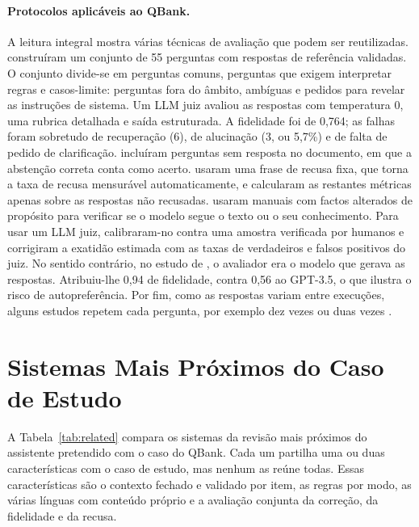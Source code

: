 \paragraph{Protocolos aplicáveis ao QBank.} A leitura integral mostra várias técnicas de avaliação que podem ser reutilizadas. \textcite{buti2026evaluating} construíram um conjunto de 55 perguntas com respostas de referência validadas. O conjunto divide-se em perguntas comuns, perguntas que exigem interpretar regras e casos-limite: perguntas fora do âmbito, ambíguas e pedidos para revelar as instruções de sistema. Um \gls{LLM} juiz avaliou as respostas com temperatura 0, uma rubrica detalhada e saída estruturada. A fidelidade foi de 0,764; as falhas foram sobretudo de recuperação (6), de alucinação (3, ou 5,7\%) e de falta de pedido de clarificação. \textcite{hamidi2026large} incluíram perguntas sem resposta no documento, em que a abstenção correta conta como acerto. \textcite{ishadya2026mitigating} usaram uma frase de recusa fixa, que torna a taxa de recusa mensurável automaticamente, e calcularam as restantes métricas apenas sobre as respostas não recusadas. \textcite{jain2025aligning} usaram manuais com factos alterados de propósito para verificar se o modelo segue o texto ou o seu conhecimento. Para usar um \gls{LLM} juiz, \textcite{liao2026heal} calibraram-no contra uma amostra verificada por humanos e corrigiram a exatidão estimada com as taxas de verdadeiros e falsos positivos do juiz. No sentido contrário, no estudo de \textcite{khan2025towards}, o avaliador era o modelo que gerava as respostas. Atribuiu-lhe 0,94 de fidelidade, contra 0,56 ao GPT-3.5, o que ilustra o risco de autopreferência. Por fim, como as respostas variam entre execuções, alguns estudos repetem cada pergunta, por exemplo dez vezes \parencite{nurfadhilah2025retrieval} ou duas vezes \parencite{feng2024courseassist}.

\section{Sistemas Mais Próximos do Caso de Estudo}
\label{sec:chap2_related}

A Tabela~\ref{tab:related} compara os sistemas da revisão mais próximos do assistente pretendido com o caso do QBank. Cada um partilha uma ou duas características com o caso de estudo, mas nenhum as reúne todas. Essas características são o contexto fechado e validado por item, as regras por modo, as várias línguas com conteúdo próprio e a avaliação conjunta da correção, da fidelidade e da recusa.

